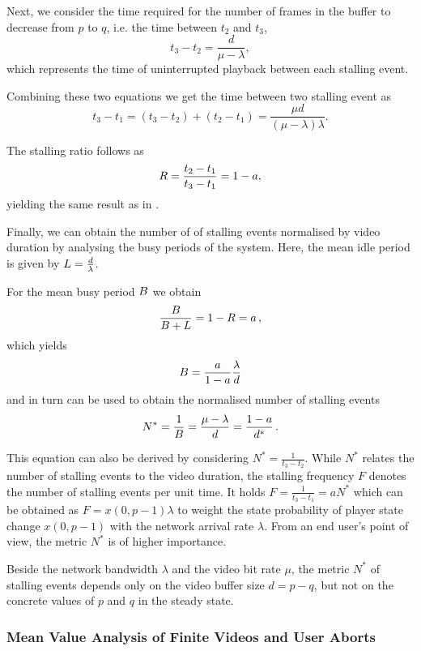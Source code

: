 Next, we consider the time required for the number of frames \currentNumberFrames in the buffer to decrease from \(p\) 
to \(q\), i.e. the time between \(t_2\) and \(t_3\), 
\[t_3-t_2 = \frac{d}{\mu-\lambda},\]
which represents the time of uninterrupted playback between each stalling event.

Combining these two equations we get the time between two stalling event as
\[
t_3-t_1=(t_3-t_2)+(t_2-t_1)=\frac{\mu d}{(\mu-\lambda)\lambda}.
\]

The stalling ratio \stallingRatio follows as
\begin{equation*}
R = \frac{t_2-t_1}{t_3-t_1} = 1-a,
\end{equation*}
yielding the same result as in .

Finally, we can obtain the number of of stalling events normalised by video duration by analysing the busy periods of the system.
Here, the mean idle period is given by \(L = \frac{d}{\lambda}\).

For the mean busy period \(B\) we obtain
\[
\frac{B}{B + L} = 1 - R = a \, ,
\]
which yields
\[
B = \frac{a}{1-a}\frac{\lambda}{d} 
\]
and in turn can be used to obtain the normalised number of stalling events 
\begin{equation*}
N^* = \frac{1}{B}=\frac{\mu-\lambda}{d} = \frac{1-a}{d^*}\, .
\end{equation*}

This equation can also be derived by considering \(N^*=\frac{1}{t_3-t_2}\). 
While \(N^*\) relates the number of stalling events to the video duration, the stalling frequency \(F\) denotes the number of stalling events per unit time. 
It holds \(F=\frac{1}{t_3-t_1}=a N^*\) which can be obtained as \(F=x(0,p-1) \lambda\) to weight the state probability of player state change \(x(0,p-1)\) with the network arrival rate \(\lambda\). 
From an end user's point of view, the metric $N^*$ is of higher importance. 

Beside the network bandwidth \(\lambda\) and the video bit rate \(\mu\), the metric \(N^*\) of stalling events depends only on the video buffer size \(d=p-q\), but not on the concrete values of \(p\) and \(q\) in the steady state.


\subsubsection*{Mean Value Analysis of Finite Videos and User Aborts}\label{sec:application:qoe_user_behaviour:system_model:finite_video}

